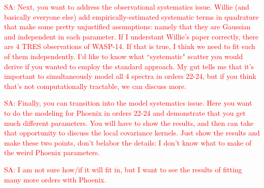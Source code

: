 \documentclass[iop,floatfix]{emulateapj}
\newcommand{\Z}{[{\rm Fe}/{\rm H}]}
\newcommand{\comm}[1]{ \textcolor{red}{SA: #1}}
\begin{document}
\comm{Next, you want to address the observational systematics issue.  Willie (and basically 
everyone else) add empirically-estimated systematic terms in quadrature that make some pretty 
unjustified assumptions: namely that they are Gaussian and independent in each parameter.  If I 
understant Willie's paper correctly, there are 4 TRES observations of WASP-14.  If that is true, I 
think we need to fit each of them independently.  I'd like to know what ``systematic" scatter you 
would derive if you wanted to employ the standard approach.  My gut tells me that it's important to 
simultaneously model all 4 spectra in orders 22-24, but if you think that's not 
computationally tractable, we can discuss more.}

\comm{Finally, you can transition into the model systematics issue.  Here you want to do the 
modeling for Phoenix in orders 22-24 and demonstrate that you get much different parameters.  You 
will have to show the results, and then can take that opportunity to discuss the local covariance 
kernels.  Just show the results and make these two points, don't belabor the details: I don't 
know what to make of the weird Phoenix parameters.}

\comm{I am not sure how/if it will fit in, but I want to see the results of fitting many more 
orders with Phoenix.}

\end{document}
